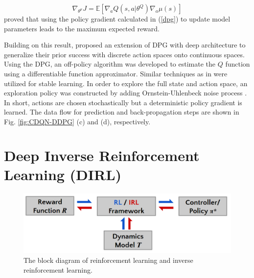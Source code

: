\documentclass[../thesis.tex]{subfiles}
\begin{document}
\begin{equation}
\nabla_{\theta^\mu} J = \mathbb{E}[\nabla_a Q(s,a|\theta^Q) \nabla_a \mu(s)]
\label{dpg}
\end{equation}
\citet{dpg} proved that using the policy gradient calculated in (\ref{dpg}) to update model parameters leads to the maximum expected reward.

Building on this result, \citet{DBLP:journals/corr/LillicrapHPHETS15} proposed an extension of DPG with deep architecture to generalize their prior success with discrete action spaces \cite{mnih2015human} onto continuous spaces. Using the DPG, an off-policy algorithm was developed to estimate the $Q$ function using a differentiable function approximator. Similar techniques as in \cite{mnih2015human} were utilized for stable learning. In order to explore the full state and action space, an exploration policy was constructed by adding Ornstein-Uhlenbeck noise process \cite{uhlenbeck1930theory}. In short, actions are chosen stochastically but a deterministic policy gradient is learned. The data flow for prediction and back-propagation steps are shown in Fig. \ref{fig:CDQN-DDPG} (c) and (d), respectively.



\section{Deep Inverse Reinforcement Learning (DIRL)} 
\label{sec:dirl}


\begin{figure}[t]
	\begin{center}
		\centerline{\includegraphics[width=0.5\columnwidth]{./DIRL/fig/irl_rl_pipeline.png}}
		\caption{The block diagram of reinforcement learning and inverse reinforcement learning.}
		\label{fig:irl_rl}
	\end{center}
\end{figure} 
\end{document}
